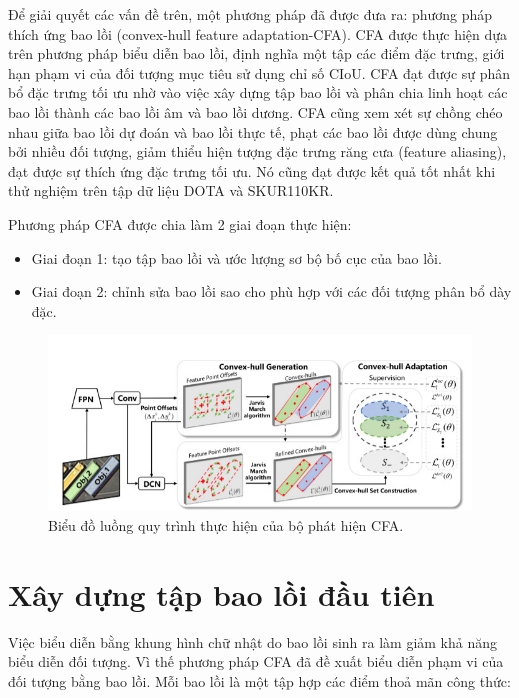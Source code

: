 \documentclass[12pt,a4paper,openany,oneside]{report}
\begin{document}
Để giải quyết các vấn đề trên, một phương pháp đã được đưa ra: phương pháp thích ứng bao lồi (convex-hull feature adaptation-CFA). CFA được thực hiện dựa trên phương pháp biểu diễn bao lồi, định nghĩa một tập các điểm đặc trưng, giới hạn phạm vi của đối tượng mục tiêu sử dụng chỉ số CIoU. CFA đạt được sự phân bổ đặc trưng tối ưu nhờ vào việc xây dựng tập bao lồi và phân chia linh hoạt các bao lồi thành các bao lồi âm và bao lồi dương. CFA cũng xem xét sự chồng chéo nhau giữa bao lồi dự đoán và bao lồi thực tế, phạt các bao lồi được dùng chung bởi nhiều đối tượng, giảm thiểu hiện tượng đặc trưng răng cưa (feature aliasing), đạt được sự thích ứng đặc trưng tối ưu. Nó cũng đạt được kết quả tốt nhất khi thử nghiệm trên tập dữ liệu DOTA và SKUR110KR.

Phương pháp CFA được chia làm 2 giai đoạn thực hiện:
\begin{itemize}
	\item Giai đoạn 1: tạo tập bao lồi và ước lượng sơ bộ bố cục của bao lồi.
	\item Giai đoạn 2: chỉnh sửa bao lồi sao cho phù hợp với các đối tượng phân bổ dày đặc.
\end{itemize}

\begin{figure}[ht!]
	\begin{center}
		\includegraphics[width=450px]{./work_flow_cfa.JPG}
		\caption{Biểu đồ luồng quy trình thực hiện của bộ phát hiện CFA.}
		\label{work_flow_cfa}
	\end{center}
\end{figure} 

\section{Xây dựng tập bao lồi đầu tiên}
Việc biểu diễn bằng khung hình chữ nhật do bao lồi sinh ra làm giảm khả năng biểu diễn đối tượng. Vì thế phương pháp CFA đã đề xuất biểu diễn phạm vi của đối tượng bằng bao lồi. Mỗi bao lồi là một tập hợp các điểm thoả mãn công thức:
\end{document}
